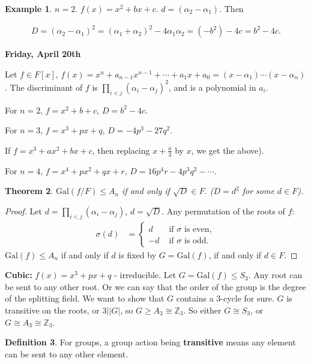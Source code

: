 \documentclass[9pt,reqno,twoside]{amsbook}
\theoremstyle{plain}
\newtheorem{theorem}{Theorem}[chapter]
\numberwithin{section}{chapter}
\numberwithin{equation}{chapter}
\theoremstyle{definition}
\newtheorem{Def}[theorem]{Definition}
\newtheorem{Ex}[theorem]{Example}
\theoremstyle{remark}
\theoremstyle{plain}
\newcommand{\z}{\mathbb{Z}}
\newcommand{\bb}{\vspace{3mm}}
\newcommand{\bee}{\begin{equation}\begin{aligned}}
\newcommand{\eee}{\end{aligned}\end{equation}}
\newcommand{\fracc}{\frac}
\newcommand{\gal}{\mathrm{Gal}}
\newcommand{\qwe}{\sqrt}
\renewcommand{\leq}{\leqslant}
\renewcommand{\geq}{\geqslant}
\begin{document}
\begin{Ex}
$n = 2$. $f(x) = x^2 + bx + c$.  $d = (\alpha_2 - \alpha_1)$. Then 

\bee
D = (\alpha_2 - \alpha_1)^2 = (\alpha_1 + \alpha_2)^2  - 4\alpha_1\alpha_2 = (-b^2) - 4c = b^2 - 4c.
\eee
\end{Ex}


\bb

\textbf{Friday, April 20th}

Let $f \in F[x]$, $f(x) = x^n + a_{n - 1}x^{n - 1} + \cdots + a_1x + a_0 = (x - \alpha_1)\cdots(x - \alpha_n)$. The discriminant of $f$ is $\prod_{i < j}(\alpha_i - \alpha_j)^2$, and is a polynomial in $a_i$. 

For $n = 2$, $f = x^2 + b + c$, $D = b^2 - 4c$. 

For $n = 3$, $f = x^3 + px + q$, $D = -4p^3 - 27q^2$. 

If $f = x^3 + ax^2 + bx + c$, then replacing $x + \fracc{a}{3}$ by $x$, we get the above). 

For $n = 4$, $f = x^4 + px^2 + qx + r$, $D = 16p^4r -4p^3q^2 - \cdots$.


\begin{theorem}
$\gal(f/F)\leq A_n$ if and only if $\qwe{D} \in F$. ($D = d^2$ for some $d \in F$).
\end{theorem}

\begin{proof}
Let $d = \prod_{i < j}(\alpha_i - \alpha_j)$, $d = \qwe{D}$. 
Any permutation of the roots of $f$:
\bee
\sigma(d) &= 
\begin{cases}
d & \text{ if }\sigma \text{ is even},\\
-d & \text{ if }\sigma \text{ is odd}.
\end{cases}
\eee 
$\gal(f) \leq A_n$ if and only if $d$ is fixed by  $G = \gal(f)$, if and only if $d \in F$. 
\end{proof}

\textbf{Cubic: }$f(x) = x^3 + px + q$ - irreducible. Let $G = \gal(f) \leq S_3$. Any root can be sent to any other root. Or we can say that the order of the group is the degree of the splitting field. We want to show that $G$ contains a $3$-cycle for sure. $G$ is transitive on the roots, or $3||G|$, so $G \geq A_3 \cong \z_3$. So either $G \cong S_3$, or $G \cong A_3 \cong \z_3$. 

\begin{Def}
For groups, a group action being \textbf{transitive} means any element can be sent to any other element. 
\end{Def}
\end{document}
